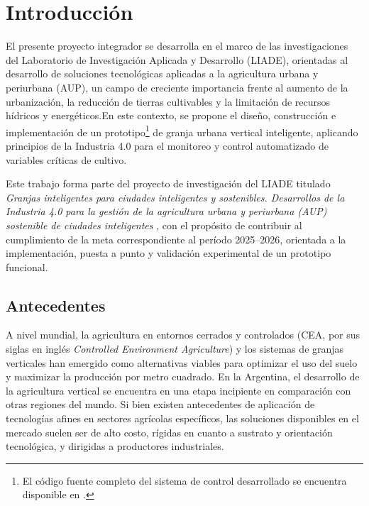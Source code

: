\chapter{Introducción}
\label{cap:introduccion}

El presente proyecto integrador se desarrolla en el marco de las investigaciones del Laboratorio de Investigación Aplicada y Desarrollo (LIADE), orientadas al desarrollo de soluciones tecnológicas aplicadas a la agricultura urbana y periurbana (AUP), un campo de creciente importancia frente al aumento de la urbanización, la reducción de tierras cultivables y la limitación de recursos hídricos y energéticos.En este contexto, se propone el diseño, construcción e implementación de un prototipo\footnote{El código fuente completo del sistema de control desarrollado se encuentra disponible en \cite{repo}.} de granja urbana vertical inteligente, aplicando principios de la Industria 4.0 para el monitoreo y control automatizado de variables críticas de cultivo.


Este trabajo forma parte del proyecto de investigación del LIADE titulado \textit{Granjas inteligentes para ciudades inteligentes y sostenibles. Desarrollos de la Industria 4.0 para la gestión de la agricultura urbana y periurbana (AUP) sostenible de ciudades inteligentes} \cite{vanella2023}, con el propósito de contribuir al cumplimiento de la meta correspondiente al período 2025--2026, orientada a la implementación, puesta a punto y validación experimental de un prototipo funcional.

\section{Antecedentes}
\label{sec:antecedentes}

A nivel mundial, la agricultura en entornos cerrados y controlados (CEA, por sus siglas en inglés \textit{Controlled Environment Agriculture}) y los sistemas de granjas verticales han emergido como alternativas viables para optimizar el uso del suelo y maximizar la producción por metro cuadrado. En la Argentina, el desarrollo de la agricultura vertical se encuentra en una etapa incipiente en comparación con otras regiones del mundo. Si bien existen antecedentes de aplicación de tecnologías afines en sectores agrícolas específicos, las soluciones disponibles en el mercado suelen ser de alto costo, rígidas en cuanto a sustrato y orientación tecnológica, y dirigidas a productores industriales.

